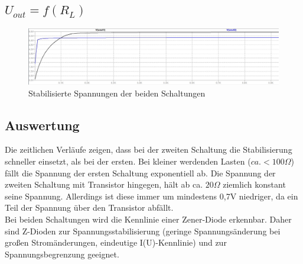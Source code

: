 \documentclass{article}
\begin{document}
\subsection{$U_{out} = f (R_L)$}
\begin{figure}[h]
  \centering
  \includegraphics[scale=0.4]{../assets/images/EL1P3/aufgabe 3 u messung.JPG}
  \caption{Stabilisierte Spannungen der beiden Schaltungen}
\end{figure}

\subsection{Auswertung}
Die zeitlichen Verläufe zeigen, dass bei der zweiten Schaltung die Stabilisierung schneller einsetzt, als bei der ersten. Bei kleiner werdenden Lasten ($ca. <100\Omega$) fällt die Spannung der ersten Schaltung exponentiell ab.
Die Spannung der zweiten Schaltung mit Transistor hingegen, hält ab ca. $20\Omega$ ziemlich konstant seine Spannung.
Allerdings ist diese immer um mindestens 0,7V niedriger, da ein Teil der Spannung über den Transistor abfällt.\\
Bei beiden Schaltungen wird die Kennlinie einer Zener-Diode erkennbar. Daher sind Z-Dioden zur Spannungsstabilisierung (geringe Spannungsänderung bei großen Stromänderungen, eindeutige I(U)-Kennlinie) und zur Spannungsbegrenzung geeignet.
\end{document}

